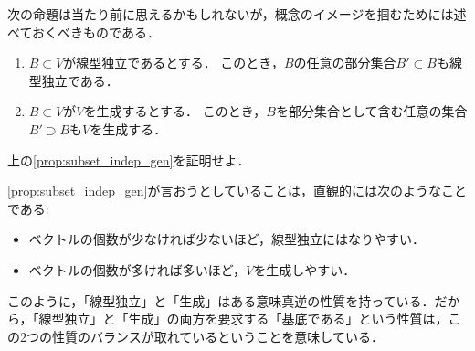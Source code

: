 次の命題は当たり前に思えるかもしれないが，概念のイメージを掴むためには述べておくべきものである．
\begin{prop}\label{prop:subset_indep_gen}
\begin{enumerate}
    \item $B\subset V$が線型独立であるとする．
    このとき，$B$の任意の部分集合$B' \subset B$も線型独立である．
    \item $B \subset V$が$V$を生成するとする．
    このとき，$B$を部分集合として含む任意の集合$B' \supset B$も$V$を生成する．
\end{enumerate}
\end{prop}
\begin{exercise}
上の\cref{prop:subset_indep_gen}を証明せよ．
\end{exercise}
\cref{prop:subset_indep_gen}が言おうとしていることは，直観的には次のようなことである:
\begin{itemize}
    \item ベクトルの個数が少なければ少ないほど，線型独立にはなりやすい．
    \item ベクトルの個数が多ければ多いほど，$V$を生成しやすい．
\end{itemize}
このように，「線型独立」と「生成」はある意味真逆の性質を持っている．だから，「線型独立」と「生成」の両方を要求する「基底である」という性質は，この2つの性質のバランスが取れているということを意味している．

